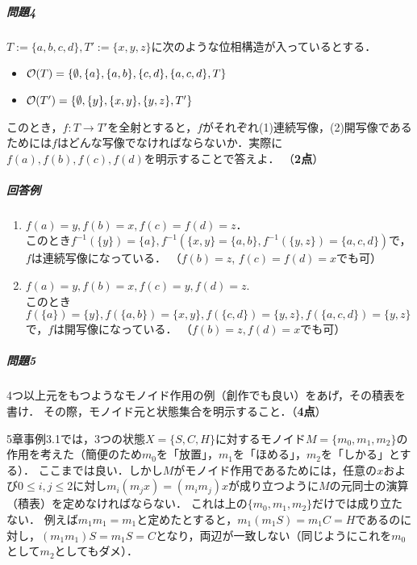 \documentclass[11pt,a4paper]{jsarticle}
\begin{document}
\subparagraph{問題4}
$T := \{a, b, c, d\}, T' := \{x, y, z\}$に次のような位相構造が入っているとする．
\begin{itemize}
 \item $\mathcal{O}(T) = \{ \emptyset, \{a \}, \{a, b\}, \{c, d\}, \{a, c, d\}, T \}$
 \item $\mathcal{O}(T') = \{ \emptyset, \{y \}, \{x, y\}, \{y, z\}, T' \}$
\end{itemize}
このとき，$f:T \to T'$を全射とすると，$f$がそれぞれ(1)連続写像，(2)開写像であるためには$f$はどんな写像でなければならないか．実際に$f(a), f(b), f(c), f(d)$を明示することで答えよ．
（\textbf{2点}）



\subparagraph{回答例}
\begin{enumerate}
 \item $f(a)=y, f(b)=x, f(c)=f(d)=z$．\\
       このとき$f^{-1}(\{y\}) = \{a\}, f^{-1}(\{x,y\} = \{a,b\}, f^{-1}(\{y,z\})=\{a,c,d\})$で，$f$は連続写像になっている．
       （$f(b)=z$, $f(c)=f(d)=x$でも可）
 \item $f(a)=y, f(b)=x, f(c)=y, f(d)=z$.\\
       このとき$f(\{a\}) = \{y\}, f(\{a, b\})=\{x,y\}, f(\{c, d\})=\{y,z\}, f(\{a, c, d\})=\{y,z\}$で，$f$は開写像になっている．
       （$f(b)=z, f(d)=x$でも可）
\end{enumerate}






\subparagraph{問題5}
4つ以上元をもつようなモノイド作用の例（創作でも良い）をあげ，その積表を書け．
その際，モノイド元と状態集合を明示すること．（\textbf{4点}）





5章事例3.1では，3つの状態$X=\{S, C, H\}$に対するモノイド$M=\{m_0, m_1, m_2\}$の作用を考えた（簡便のため$m_0$を「放置」，$m_1$を「ほめる」，$m_2$を「しかる」とする）．
ここまでは良い．しかし$M$がモノイド作用であるためには，任意の$x$および$0 \leq i,j \leq 2$に対し$m_i (m_j x) = (m_i m_j) x$が成り立つように$M$の元同士の演算（積表）を定めなければならない．
これは上の$\{m_0, m_1, m_2\}$だけでは成り立たない．
例えば$m_1 m_1 = m_1$と定めたとすると，$m_1 (m_1 S) = m_1 C = H$であるのに対し，$(m_1 m_1) S = m_1 S = C$となり，両辺が一致しない（同じようにこれを$m_0$として$m_2$としてもダメ）．
\end{document}
